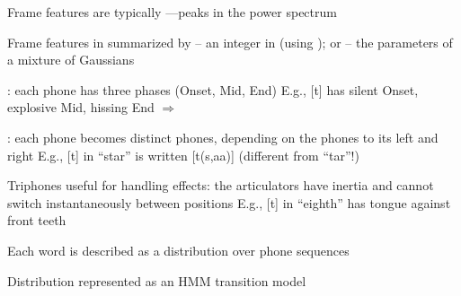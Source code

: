 \documentclass{article}
\begin{document}
\begin{huge}
\vspace*{0.2in}

\textwidth
{}

Frame features are typically ---peaks in the power spectrum








Frame features in  summarized by\al
  -- an integer in \mat{$[0\ldots 255]$} (using ); or\al
  -- the parameters of a mixture of Gaussians

: each phone has three phases (Onset, Mid, End)\al
 E.g., [t] has silent Onset, explosive Mid, hissing End\al
 $\Rightarrow$ 

: each phone becomes  distinct phones,
depending on the phones to its left and right\al
  E.g., [t] in ``star'' is written [t(s,aa)] (different from ``tar''!)

Triphones useful for handling  effects: the articulators
have inertia and cannot switch instantaneously between positions\al
E.g., [t] in ``eighth'' has tongue against front teeth


\vspace*{0.2in}

\textwidth
{}






Each word is described as a distribution over phone sequences

Distribution represented as an HMM transition model

\vspace*{0.2in}

\textwidth
{}



\end{huge}
\end{document}
